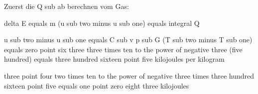 Zuerst die Q sub ab berechnen vom Gas:

delta E equals m (u sub two minus u sub one) equals integral Q

u sub two minus u sub one equals C sub v p sub G (T sub two minus T sub one) equals zero point six three three times ten to the power of negative three (five hundred) equals three hundred sixteen point five kilojoules per kilogram

three point four two times ten to the power of negative three times three hundred sixteen point five equals one point zero eight three kilojoules
